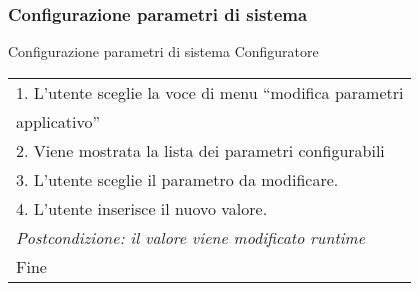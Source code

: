 \begin{minipage}{\textwidth}
    \subsubsection{Configurazione parametri di sistema}
    \usecase
        {Configurazione parametri di sistema}
        {
            Configuratore
        }
        {
            \begin{tabular}{l}
                1. L'utente sceglie la voce di menu ``modifica parametri \\applicativo''\\
                2. Viene mostrata la lista dei parametri configurabili\\
                3. L'utente sceglie il parametro da modificare.\\
                4. L'utente inserisce il nuovo valore.\\
                \textit{Postcondizione: il valore viene modificato runtime}\\
                Fine
            \end{tabular}\\

            \\

        }
        \vspace{0.5cm}
\end{minipage}
